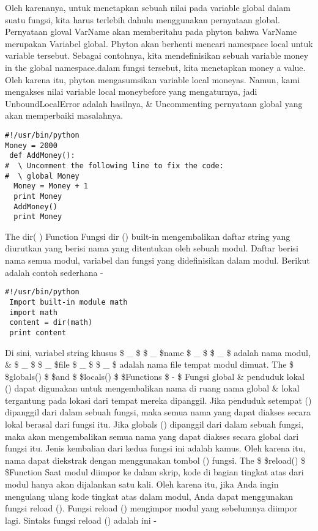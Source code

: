 Oleh karenanya, untuk menetapkan sebuah nilai pada variable global dalam suatu fungsi, kita harus terlebih dahulu menggunakan pernyataan global. Pernyataan gloval VarName akan memberitahu pada phyton bahwa VarName merupakan Variabel global. Phyton akan berhenti mencari namespace local untuk variable tersebut.
Sebagai contohnya, kita mendefinisikan sebuah variable money in the global namespace.dalam fungsi tersebut, kita menetapkan money a value. Oleh karena itu, phyton mengasumsikan variable local moneyas. Namun, kami mengakses nilai variable local moneybefore yang mengaturnya, jadi UnboundLocalError adalah hasilnya, \& Uncommenting pernyataan global yang akan memperbaiki masalahnya.
 
\begin{verbatim}
#!/usr/bin/python  
Money = 2000  
 def AddMoney():  
#  \ Uncomment the following line to fix the code:  
#  \ global Money  
  Money = Money + 1  
  print Money  
  AddMoney() 
  print Money
 \end{verbatim}
The dir( ) Function  
Fungsi dir () built-in mengembalikan daftar string yang diurutkan yang berisi nama yang ditentukan oleh sebuah modul. 
Daftar berisi nama semua modul, variabel dan fungsi yang didefinisikan dalam modul. Berikut adalah contoh sederhana - 
\begin{verbatim}
#!/usr/bin/python 
 Import built-in module math  
 import math  
 content = dir(math) 
 print content 
\end{verbatim}
Di sini, variabel string khusus  \$  \_  \$ \$  \_  \$name \$  \_  \$ \$  \_  \$ adalah nama modul, \&  \$  \_  \$ \$  \_  \$file \$  \_  \$ \$  \_  \$ adalah nama file tempat modul dimuat. 
The \$  \$globals() \$  \$and \$  \$locals() \$  \$Functions  \$ - \$  
Fungsi global  \& penduduk lokal () dapat digunakan untuk mengembalikan nama di ruang nama global \& lokal tergantung pada lokasi dari tempat mereka dipanggil.  
Jika penduduk setempat () dipanggil dari dalam sebuah fungsi, maka semua nama yang dapat diakses secara lokal berasal dari fungsi itu. 
Jika globals () dipanggil dari dalam sebuah fungsi, maka akan mengembalikan semua nama yang dapat diakses secara global dari fungsi itu. 
Jenis kembalian dari kedua fungsi ini adalah kamus. Oleh karena itu, nama dapat diekstrak dengan menggunakan tombol () fungsi.
The \$  \$reload() \$  \$Function  
Saat modul diimpor ke dalam skrip, kode di bagian tingkat atas dari modul hanya akan dijalankan satu kali.  
Oleh karena itu, jika Anda ingin mengulang ulang kode tingkat atas dalam modul, Anda dapat menggunakan fungsi reload (). Fungsi reload () mengimpor modul yang sebelumnya diimpor lagi. Sintaks fungsi reload () adalah ini -  
